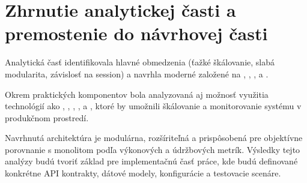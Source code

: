 \section{Zhrnutie analytickej časti a premostenie do návrhovej časti}
Analytická časť identifikovala hlavné obmedzenia  (ťažké škálovanie, slabá modularita, závislosť na session) a navrhla moderné  založené na , , ,  a .

Okrem praktických komponentov bola analyzovaná aj možnosť využitia technológií ako , , , ,  a , ktoré by umožnili škálovanie a monitorovanie systému v produkčnom prostredí.

Navrhnutá architektúra je modulárna, rozšíriteľná a prispôsobená pre objektívne porovnanie s monolitom podľa výkonových a údržbových metrík. Výsledky tejto analýzy budú tvoriť základ pre implementačnú časť práce, kde budú definované konkrétne API kontrakty, dátové modely,  konfigurácie a testovacie scenáre.